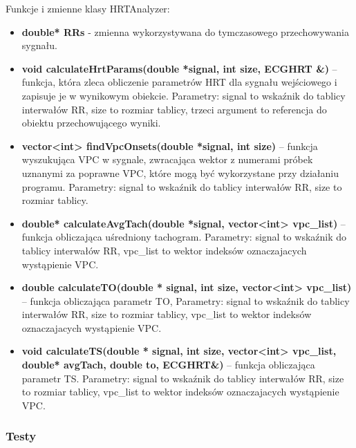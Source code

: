 \documentclass[a4paper, 11pt]{article}
\begin{document}
Funkcje i zmienne klasy HRTAnalyzer:
\begin{itemize}
\item \textbf{double* RRs} - zmienna wykorzystywana do tymczasowego przechowywania sygnału.
\item \textbf{void calculateHrtParams(double *signal, int size, ECGHRT \&)} -- funkcja, która zleca obliczenie parametrów HRT dla sygnału wejściowego i zapisuje je w wynikowym obiekcie. Parametry: signal to wskaźnik do tablicy interwałów RR, size to rozmiar tablicy, trzeci argument to referencja do obiektu przechowującego wyniki.
\item \textbf{vector<int> findVpcOnsets(double *signal, int size)} -- funkcja wyszukująca VPC w sygnale, zwracająca wektor 
z numerami próbek uznanymi za poprawne VPC, które mogą być wykorzystane przy działaniu programu. Parametry: signal to wskaźnik do tablicy interwałów RR, size to rozmiar tablicy.
\item \textbf{double* calculateAvgTach(double *signal, vector<int> vpc\_list) } -- funkcja obliczająca uśredniony tachogram.
Parametry: signal to wskaźnik do tablicy interwałów RR, vpc\_list to wektor indeksów oznaczajacych wystąpienie VPC.
\item \textbf{double calculateTO(double * signal, int size, vector<int> vpc\_list) }  -- funkcja obliczająca parametr TO,
Parametry: signal to wskaźnik do tablicy interwałów RR, size to rozmiar tablicy, vpc\_list to wektor indeksów oznaczajacych wystąpienie VPC.
\item \textbf{void calculateTS(double * signal, int size, vector<int> vpc\_list, double* avgTach, double to, ECGHRT\&)} -- funkcja obliczająca parametr TS. Parametry: signal to wskaźnik do tablicy interwałów RR, size to rozmiar tablicy, vpc\_list to wektor indeksów oznaczajacych wystąpienie VPC.
\end{itemize}

\subsubsection{Testy}
\label{sec:hrt:tests}
\end{document}
